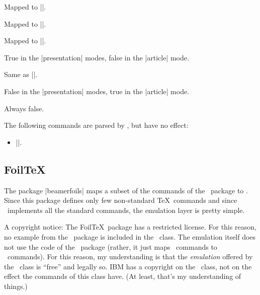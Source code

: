 \begin{command}{\red}
  Mapped to |\color{red}|.
\end{command}

\begin{command}{\blue}
  Mapped to |\color{blue}|.
\end{command}

\begin{command}{\green}
  Mapped to |\color{green}|.
\end{command}

\begin{command}{\ifslide}
  True in the |presentation| modes, false in the |article| mode.
\end{command}

\begin{command}{\ifslidesonly}
  Same as |\ifslide|.
\end{command}

\begin{command}{\ifarticle}
  False in the |presentation| modes, true in the |article| mode.
\end{command}

\begin{command}{\ifportrait}
  Always false.
\end{command}

The following commands are parsed by \beamer, but have no effect:
\begin{itemize}\itemsep=0pt\parskip=0pt
  \item |\ptsize|.
\end{itemize}


\subsection{Foil\TeX}
\label{section-foiltex}

The package |beamerfoils| maps a subset of the commands of the \foils\ package to \beamer. Since this package defines only few non-standard \TeX\ commands and since \beamer\ implements all the standard commands, the emulation layer is pretty simple.

A copyright notice: The Foil\TeX\ package has a restricted license. For this reason, no example from the \foils\ package is included in the \beamer\ class. The emulation itself does not use the code of the \foils\ package (rather, it just maps \foils\ commands to \beamer\ commands). For this reason, my understanding is that the \emph{emulation} offered by the \beamer\ class is ``free'' and legally so. IBM has a copyright on the \foils\ class, not on the effect the commands of this class have. (At least, that's my understanding of things.)

